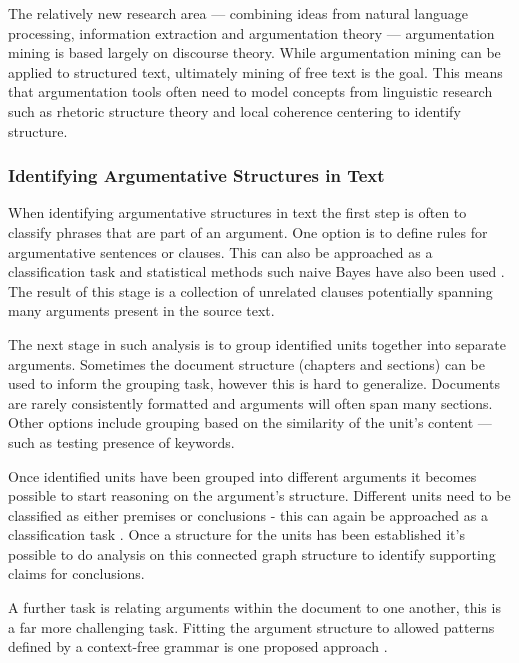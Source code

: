       The relatively new research area  --- combining ideas from natural language processing, information extraction and argumentation theory --- argumentation mining is based largely on discourse theory. While argumentation mining can be applied to structured text, ultimately mining of free text is the goal. This means that argumentation tools often need to model concepts from linguistic research such as rhetoric structure theory \cite{mann1988rhetorical} and local coherence centering \cite{weinstein21centering} to identify structure.

      \tocless\subsubsection{Identifying Argumentative Structures in Text}

        When identifying argumentative structures in text the first step is often to classify phrases that are part of an argument. One option is to define rules for argumentative sentences or clauses. This can also be approached as a classification task and statistical methods such naive Bayes have also been used \cite{palau2009argumentation}. The result of this stage is a collection of unrelated clauses potentially spanning many arguments present in the source text.

        The next stage in such analysis is to group identified units together into separate arguments. Sometimes the document structure (chapters and sections) can be used to inform the grouping task, however this is hard to generalize. Documents are rarely consistently formatted and arguments will often span many sections. Other options include grouping based on the similarity of the unit's content --- such as testing presence of keywords. \cite{palau2009argumentation}

        Once identified units have been grouped into different arguments it becomes possible to start reasoning on the argument's structure. Different units need to be classified as either premises or conclusions - this can again be approached as a classification task \cite{palau2009argumentation}. Once a structure for the units has been established it's possible to do analysis on this connected graph structure to identify supporting claims for conclusions.

        A further task is relating arguments within the document to one another, this is a far more challenging task. Fitting the argument structure to allowed patterns defined by a context-free grammar is one proposed approach \cite{palau2009argumentation}.

